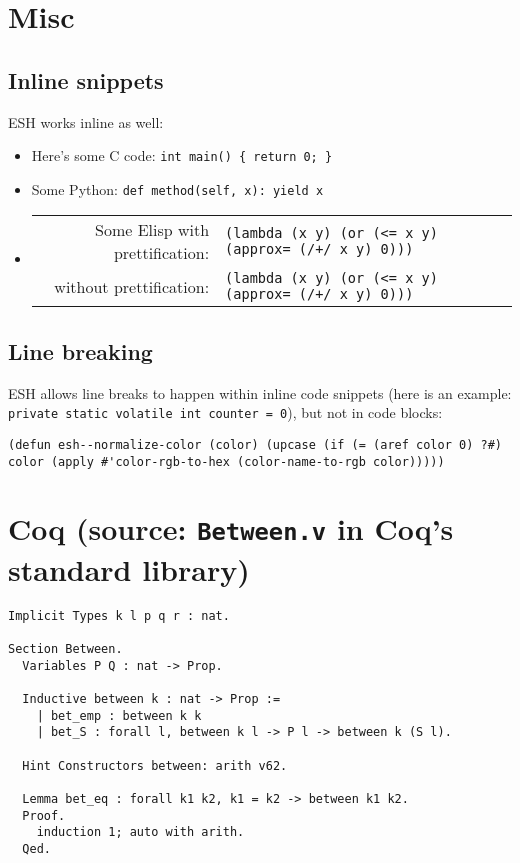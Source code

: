 \documentclass{article}
\def\cverb{\verb}
\def\javaverb{\verb}
\def\pythonverb{\verb}
\def\prettylisp{\verb}
\def\normallisp{\verb}
\begin{document}
\clearpage

\section*{Misc}

\subsection*{Inline snippets}

ESH works inline as well:

\begin{itemize}
\item Here's some C code: \cverb|int main() { return 0; }|
\item Some Python: \pythonverb|def method(self, x): yield x|
\item
  \begin{tabular}[t]{@{}r@{ }l}
    Some Elisp with prettification: & \prettylisp|(lambda (x y) (or (<= x y) (approx= (/+/ x y) 0)))| \\
            without prettification: & \normallisp|(lambda (x y) (or (<= x y) (approx= (/+/ x y) 0)))| \\
  \end{tabular}
\end{itemize}

\subsection*{Line breaking}

ESH allows line breaks to happen within inline code snippets (here is an example: \javaverb|private static volatile int counter = 0|), but not in code blocks:

\begin{verbatim}
(defun esh--normalize-color (color) (upcase (if (= (aref color 0) ?#) color (apply #'color-rgb-to-hex (color-name-to-rgb color)))))
\end{verbatim}



\section*{Coq (source: \texttt{Between.v} in Coq's standard library)}

\begin{verbatim}
Implicit Types k l p q r : nat.

Section Between.
  Variables P Q : nat -> Prop.

  Inductive between k : nat -> Prop :=
    | bet_emp : between k k
    | bet_S : forall l, between k l -> P l -> between k (S l).

  Hint Constructors between: arith v62.

  Lemma bet_eq : forall k1 k2, k1 = k2 -> between k1 k2.
  Proof.
    induction 1; auto with arith.
  Qed.
\end{verbatim}
\end{document}
